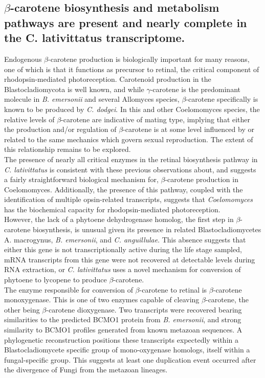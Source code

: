 \subsection*{$\beta$-carotene biosynthesis and metabolism pathways are present and nearly complete in the C. lativittatus transcriptome.}
Endogenous $\beta$-carotene production is biologically important for many reasons, one of which is that it functions as precursor to retinal, the critical component of rhodopsin-mediated photoreception. Carotenoid production in the Blastocladiomycota is well known, and while $\gamma$-carotene is the predominant molecule in \textit{B. emersonii} and several Allomyces species, $\beta$-carotene specifically is known to be produced by \textit{C. dodgei}. In this and other Coelomomyces species, the relative levels of $\beta$-carotene are indicative of mating type, implying that either the production and/or regulation of $\beta$-carotene is at some level influenced by or related to the same mechanics which govern sexual reproduction. The extent of this relationship remains to be explored. \\
\indent The presence of nearly all critical enzymes in the retinal biosynthesis pathway in \textit{C. lativittatus} is consistent with these previous observations about, and suggests a fairly straightforward biological mechanism for, $\beta$-carotene production in Coelomomyces. Additionally, the presence of this pathway, coupled with the identification of multiple opsin-related transcripts, suggests that \textit{Coelomomyces} has the biochemical capacity for rhodopsin-mediated photoreception. \\
\indent However, the lack of a phytoene dehydrogenase homolog, the first step in $\beta$-carotene biosynthesis, is unusual given its presence in related Blastocladiomycetes A. macrogynus, \textit{B. emersonii}, and \textit{C. anguillulae}. This absence suggests that either this gene is not transcriptionally active during the life stage sampled, mRNA transcripts from this gene were not recovered at detectable levels during RNA extraction, or \textit{C. lativittatus} uses a novel mechanism for conversion of phytoene to lycopene to produce $\beta$-carotene. \\
\indent The enzyme responsible for conversion of $\beta$-carotene to retinal is $\beta$-carotene monoxygenase. This is one of two enzymes capable of cleaving $\beta$-carotene, the other being $\beta$-carotene dioxygenase. Two transcripts were recovered bearing similarities to the predicted BCMO1 protein from \textit{B. emersonii}, and strong similarity to BCMO1 profiles generated from known metazoan sequences. A phylogenetic reconstruction positions these transcripts expectedly within a Blastocladiomycete specific group of mono-oxygenase homologs, itself within a fungal-specific group. This suggests at least one duplication event occurred after the divergence of Fungi from the metazoan lineages. \\
